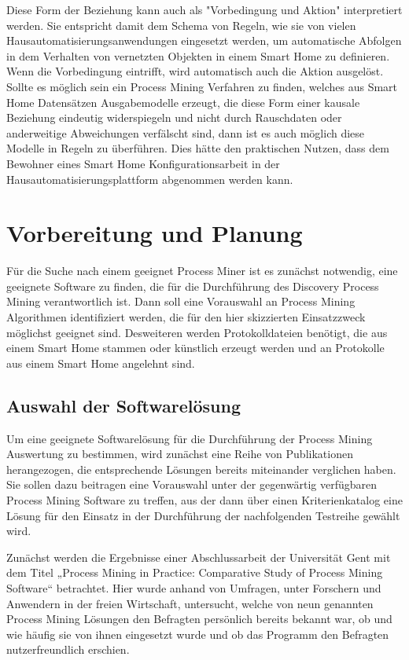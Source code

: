 Diese Form der Beziehung kann auch als "Vorbedingung und Aktion" interpretiert werden. Sie entspricht damit dem Schema von Regeln, wie sie von vielen Hausautomatisierungsanwendungen eingesetzt werden, um automatische Abfolgen in dem Verhalten von vernetzten Objekten in einem Smart Home zu definieren. Wenn die Vorbedingung eintrifft, wird automatisch auch die Aktion ausgelöst. Sollte es möglich sein ein Process Mining Verfahren zu finden, welches aus Smart Home Datensätzen Ausgabemodelle erzeugt, die diese Form einer kausale Beziehung eindeutig widerspiegeln und nicht durch Rauschdaten oder anderweitige Abweichungen verfälscht sind, dann ist es auch möglich diese Modelle in Regeln zu überführen. Dies hätte den praktischen Nutzen, dass dem Bewohner eines Smart Home Konfigurationsarbeit in der Hausautomatisierungsplattform abgenommen werden kann.

\section{Vorbereitung und Planung}\label{sec:prep}
Für die Suche nach einem geeignet Process Miner ist es zunächst notwendig, eine geeignete Software zu finden, die für die Durchführung des Discovery Process Mining verantwortlich ist. 
Dann soll eine Vorauswahl an Process Mining Algorithmen identifiziert werden, die für den hier skizzierten Einsatzzweck möglichst geeignet sind. Desweiteren werden Protokolldateien benötigt, die aus einem Smart Home stammen oder künstlich erzeugt werden und an Protokolle aus einem Smart Home angelehnt sind.

\subsection{Auswahl der Softwarelösung}
Um eine geeignete Softwarelösung für die Durchführung der Process Mining Auswertung zu bestimmen, wird zunächst eine Reihe von Publikationen herangezogen, die entsprechende Lösungen bereits miteinander verglichen haben. Sie sollen dazu beitragen eine Vorauswahl unter der gegenwärtig verfügbaren Process Mining Software zu treffen, aus der dann über einen Kriterienkatalog eine Lösung für den Einsatz in der Durchführung der nachfolgenden Testreihe gewählt wird. 

Zunächst werden die Ergebnisse einer Abschlussarbeit der Universität Gent mit dem Titel „Process Mining in Practice: Comparative Study of Process Mining Software“ \cite{verstraete} betrachtet. Hier wurde anhand von Umfragen, unter Forschern und Anwendern in der freien Wirtschaft, untersucht, welche von neun genannten Process Mining Lösungen den Befragten persönlich bereits bekannt war, ob und wie häufig sie von ihnen eingesetzt wurde und ob das Programm den Befragten nutzerfreundlich erschien.

